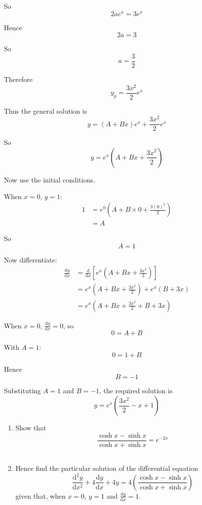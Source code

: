 \documentclass[leqno]{article}
\begin{document}
\begin{enumerate}[
  label=\textbf{\arabic*.},
  leftmargin=*,
  topsep=0pt,
  partopsep=0pt,
  parsep=0pt
]
\begin{djsSolution}
\begin{enumerate}[label=\textbf{(\alph*)}]
So
\[
2ae^x=3e^x
\]

Hence
\[
2a=3
\]

So
\[
a=\frac{3}{2}
\]

Therefore
\[
y_p=\frac{3x^2}{2}e^x
\]

Thus the general solution is
\[
y=(A+Bx)e^x+\frac{3x^2}{2}e^x
\]

So
\[
y=e^x\left(A+Bx+\frac{3x^2}{2}\right)
\]

Now use the initial conditions.

When $x=0$, $y=1$:
\begin{align*}
1
&= e^0\left(A+B\times 0+\frac{3(0)^2}{2}\right) \\
&= A
\end{align*}

So
\[
A=1
\]

Now differentiate:
\begin{align*}
\frac{\mathrm{d}y}{\mathrm{d}x}
&= \frac{\mathrm{d}}{\mathrm{d}x}\left[e^x\left(A+Bx+\frac{3x^2}{2}\right)\right] \\
&= e^x\left(A+Bx+\frac{3x^2}{2}\right)+e^x(B+3x) \\
&= e^x\left(A+Bx+\frac{3x^2}{2}+B+3x\right)
\end{align*}

When $x=0$, $\frac{\mathrm{d}y}{\mathrm{d}x}=0$, so
\[
0=A+B
\]

With $A=1$:
\[
0=1+B
\]

Hence
\[
B=-1
\]

Substituting $A=1$ and $B=-1$, the required solution is
\[
y=e^x\left(\frac{3x^2}{2}-x+1\right)
\]

\end{enumerate}
\end{djsSolution}


\newpage

\questionitem

\begin{enumerate}[label=\textbf{(\alph*)}]
  \item Show that \[\frac{\cosh x - \sinh x}{\cosh x + \sinh x}=e^{-2x}\]  \\
  \item Hence find the particular solution of the differential equation
  \[
  \frac{\mathrm{d}^2 y}{\mathrm{d}x^2} + 4\frac{\mathrm{d}y}{\mathrm{d}x} + 4y = 4\left(\frac{\cosh x - \sinh x}{\cosh x + \sinh x}\right)
  \]
  given that, when $x=0$, $y=1$ and $\frac{\mathrm{d}y}{\mathrm{d}x}=1$.  \\
\end{enumerate}


\end{enumerate}
\end{document}

